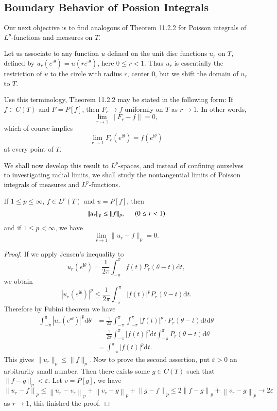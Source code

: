 \subsection{Boundary Behavior of Possion Integrals}
Our next objective is to find analogous of Theorem 11.2.2 for Poisson integrals of $L^p$-functions and measures on $T$.\par
Let us associate to any function $u$ defined on the unit disc functions $u_r$ on $T$, defined by $u_r(e^{\mathrm{i}\theta})=u(re^{\mathrm{i}\theta})$, here $0\le r<1$. Thus $u_r$ is essentially the restriction of $u$ to the circle with radius $r$, center $0$, but we shift the domain of $u_r$ to $T$.\par
Use this terminology, Theorem 11.2.2 may be stated in the following form: If $f\in C(T)$ and $F=P[f]$, then $F_r\to f$ uniformly on $T$ as $r\to 1$. In other words, 
$$
\lim_{r\rightarrow 1} \left\| F_r-f \right\| =0,
$$
which of course implies 
$$
\lim_{r\rightarrow 1} F_r\left( e^{\mathrm{i}\theta} \right) =f\left( e^{\mathrm{i}\theta} \right) 
$$
at every point of $T$.\par
We shall now develop this result to $L^p$-spaces, and instead of confining ourselves to investigating radial limits, we shall study the nontangential limits of Poisson integrals of measures and $L^p$-functions.
\begin{theorem}
If $1\le p\le\infty$, $f\in L^p(T)$ and $u=P[f]$, then 
$$\|u_r\|_p\le\|f\|_p,\hspace{0.5cm}(0\le r<1)$$
and if $1\le p<\infty$, we have 
$$\lim_{r\to 1}\|u_r-f\|_p=0.$$
\end{theorem}
\begin{proof}
If we apply Jensen's inequality to 
$$
u_r\left( e^{\mathrm{i}\theta} \right) =\frac{1}{2\pi}\int_{-\pi}^{\pi}{f\left( t \right) P_r\left( \theta -t \right) \mathrm{d}t},
$$
we obtain 
$$
\left| u_r\left( e^{\mathrm{i}\theta} \right) \right|^p\le \frac{1}{2\pi}\int_{-\pi}^{\pi}{\left| f\left( t \right) \right|^pP_r\left( \theta -t \right) \mathrm{d}t}.
$$
Therefore by Fubini theorem we have 
$$
\begin{aligned}
\int_{-\pi}^{\pi}{\left| u_r\left( e^{\mathrm{i}\theta} \right) \right|^p\mathrm{d}\theta}&=\frac{1}{2\pi}\int_{-\pi}^{\pi}{\int_{-\pi}^{\pi}{\left| f\left( t \right) \right|^p\cdot P_r\left( \theta -t \right) \mathrm{d}t}\mathrm{d}\theta}
\\
&=\frac{1}{2\pi}\int_{-\pi}^{\pi}{\left| f\left( t \right) \right|^p\mathrm{d}t\int_{-\pi}^{\pi}{P_r\left( \theta -t \right) \mathrm{d}\theta}}
\\
&=\int_{-\pi}^{\pi}{\left| f\left( t \right) \right|^p\mathrm{d}t}.
\end{aligned}
$$
This gives $\|u_r\|_p\le\|f\|_p$. Now to prove the second assertion, put $\varepsilon>0$ an arbitrarily small number. Then there exists some $g\in C(T)$ such that $\|f-g\|_p<\varepsilon$. Let $v=P[g]$, we have 
$$
\left\| u_r-f \right\| _p\le \left\| u_r-v_r \right\| _p+\left\| v_r-g \right\| _p+\left\| g-f \right\| _p\le 2\left\| f-g \right\| _p+\left\| v_r-g \right\| _p\rightarrow 2\varepsilon 
$$
as $r\to 1$, this finished the proof.
\end{proof}
